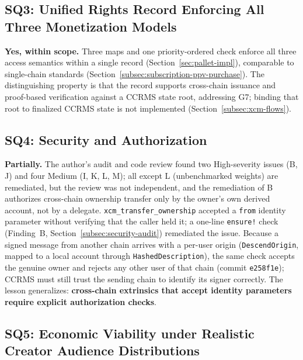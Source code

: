 \subsection[SQ3: Unified Rights Record]{SQ3: Unified Rights Record Enforcing All Three Monetization Models}\label{subsec:sq3-unified-rights-token}

\textbf{Yes, within scope.} Three maps and one priority-ordered check enforce all three access semantics within a single record (Section~\ref{sec:pallet-impl}), comparable to single-chain standards (Section~\ref{subsec:subscription-ppv-purchase}). The distinguishing property is that the record supports cross-chain issuance and proof-based verification against a CCRMS state root, addressing G7; binding that root to finalized CCRMS state is not implemented (Section~\ref{subsec:xcm-flows}).

\subsection{SQ4: Security and Authorization}\label{subsec:sq4-security-authorization}

\textbf{Partially.} The author's audit and code review found two High-severity issues (B, J) and four Medium (I, K, L, M); all except L (unbenchmarked weights) are remediated, but the review was not independent, and the remediation of B authorizes cross-chain ownership transfer only by the owner's own derived account, not by a delegate. \texttt{xcm\_transfer\_ownership} accepted a \texttt{from} identity parameter without verifying that the caller held it; a one-line \texttt{ensure!} check (Finding~B, Section~\ref{subsec:security-audit}) remediated the issue. Because a signed message from another chain arrives with a per-user origin (\texttt{DescendOrigin}, mapped to a local account through \texttt{HashedDescription}), the same check accepts the genuine owner and rejects any other user of that chain (commit \texttt{e258f1e}); CCRMS must still trust the sending chain to identify its signer correctly. The lesson generalizes: \textbf{cross-chain extrinsics that accept identity parameters require explicit authorization checks}.

\subsection[SQ5: Economic Viability]{SQ5: Economic Viability under Realistic Creator Audience Distributions}\label{subsec:sq5-economic-viability}


